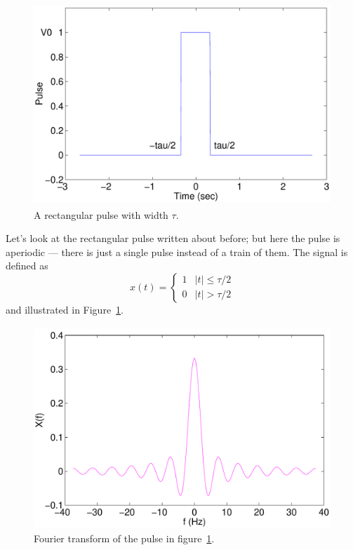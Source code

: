 \begin{figure}
\centerline{\includegraphics[height=3in]{ch-fft/ft_pulse}}
\caption{A rectangular pulse with width $\tau$. 
\label{fig:ft-pulse-x}}
\end{figure}

Let's look at the rectangular pulse written about before; but here
the pulse is aperiodic --- there is just a single pulse instead of a
train of them. The signal is defined as
\begin{equation}
x(t) = \left\{\begin{array}{ll}
                        1 & |t|\leq \tau/2 \\
                        0   & |t| > \tau/2
                        \end{array}\right.
\end{equation}
and illustrated in Figure~\ref{fig:ft-pulse-x}.  

\begin{figure}
\centerline{\includegraphics[height=3in]{ch-fft/ft_pulseX}}
\caption{Fourier transform of the pulse in
figure~\protect\ref{fig:ft-pulse-x}.
\label{fig:ft-pulse-X}}
\end{figure}

